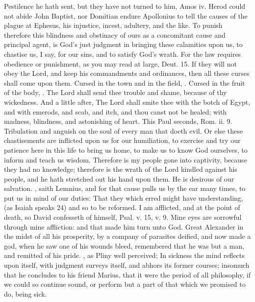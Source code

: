 {Pestilence he hath sent, but they have not turned to him, Amos iv. Herod could not abide John Baptist, nor Domitian endure Apollonius to tell the causes of the plague at Ephesus, his injustice, incest, adultery, and the like.
To punish therefore this blindness and obstinacy of ours as a concomitant cause and principal agent, is God's just judgment in bringing these calamities upon us, to chastise us, I say, for our sins, and to satisfy God's wrath.
For the law requires obedience or punishment, as you may read at large, Deut.  15. If they will not obey the Lord, and keep his commandments and ordinances, then all these curses shall come upon them. Cursed in the town and in the field, \etc{}.
Cursed in the fruit of the body, \etc{}.
The Lord shall send thee trouble and shame, because of thy wickedness.
And a little after, The Lord shall smite thee with the botch of Egypt, and with emerods, and scab, and itch, and thou canst not be healed; with madness, blindness, and astonishing of heart.
This Paul seconds, Rom. ii. 9.
Tribulation and anguish on the soul of every man that doeth evil.
Or else these chastisements are inflicted upon us for our humiliation, to exercise and try our patience here in this life to bring us home, to make us to know God ourselves, to inform and teach us wisdom.
Therefore is my people gone into captivity, because they had no knowledge; therefore is the wrath of the Lord kindled against his people, and he hath stretched out his hand upon them.
He is desirous of our salvation.
, saith Lemnius, and for that cause pulls us by the ear many times, to put us in mind of our duties: That they which erred might have understanding, (as Isaiah speaks  24) and so to be reformed.
I am afflicted, and at the point of death, so David confesseth of himself, Psal.  v. 15, v. 9.
Mine eyes are sorrowful through mine affliction: and that made him turn unto God.
Great Alexander in the midst of all his prosperity, by a company of parasites deified, and now made a god, when he saw one of his wounds bleed, remembered that he was but a man, and remitted of his pride.
, as Pliny well perceived; In sickness the mind reflects upon itself, with judgment surveys itself, and abhors its former courses; insomuch that he concludes to his friend Marius, that it were the period of all philosophy, if we could so continue sound, or perform but a part of that which we promised to do, being sick.
}
